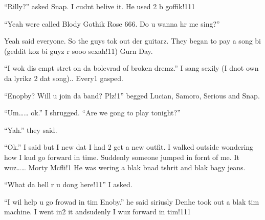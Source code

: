 \enquote{Rilly?} asked Snap. I cudnt belive it. He used 2 b goffik!111

\enquote{Yeah were called Blody Gothik Rose 666. Do u wanna hr me sing?}

Yeah said everyone. So the guys tok out der guitarz. They began to pay a song bi (geddit koz bi guyz r sooo sexah!11) Gurn Day.

\enquote{I wok dis empt stret on da bolevrad of broken dremz.} I sang sexily (I dnot own da lyrikz 2 dat song).. Every1 gasped.

\enquote{Enopby? Will u join da band? Plz!1} begged Lucian, Samoro, Serious and Snap.

\enquote{Um\ldots{}\ldots{} ok.} I shrugged. \enquote{Are we gong to play tonight?}

\enquote{Yah.} they said.

\enquote{Ok.} I said but I new dat I had 2 get a new outfit. I walked outside wondering how I kud go forward in time. Suddenly someone jumped in fornt of me. It wuz\ldots{}\ldots{} Morty Mcfli!1 He was wering a blak bnad tshrit and blak bagy jeans.

\enquote{What da hell r u dong here!11} I asked.

\enquote{I wil help u go frowad in tim Enoby.} he said siriusly Den\dotfill\newline he took out a blak tim machine. I went in2 it and\dotfill\newline sudenly I wuz forward in tim!111

